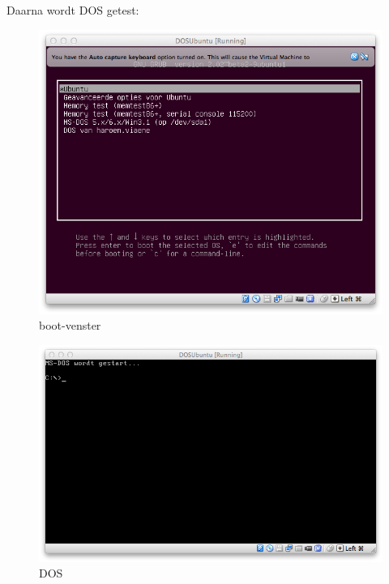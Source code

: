 \documentclass[11pt, a4paper]{article}
\begin{document}
Daarna wordt DOS getest: 

\begin{figure}[H]
	\centering
	\includegraphics[width=\textwidth]{./IMG/ZF}
	\caption{boot-venster}
\end{figure}

\begin{figure}[H]
	\centering
	\includegraphics[width=\textwidth]{./IMG/ZG}
	\caption{DOS}
\end{figure}

\newpage
\end{document}
